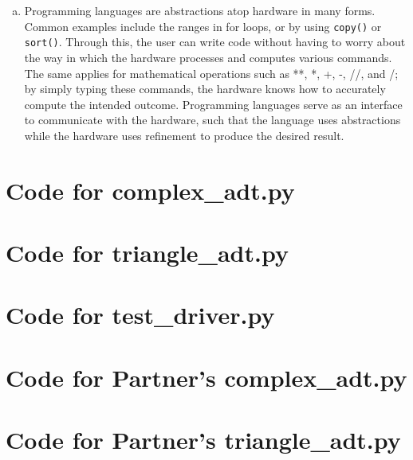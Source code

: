 \documentclass[12pt]{article}
\begin{document}
\begin{enumerate}[(a)]
\item Programming languages are abstractions atop hardware in many forms. Common examples include the ranges in for loops, or by using \verb|copy()| or \verb|sort()|. Through this, the user can write code without having to worry about the way in which the hardware processes and computes various commands. The same applies for mathematical operations such as **, *, +, -, //, and /; by simply typing these commands, the hardware knows how to accurately compute the intended outcome. Programming languages serve as an interface to communicate with the hardware, such that the language uses abstractions while the hardware uses refinement to produce the desired result. 


\end{enumerate}

\newpage

\lstset{language=Python, basicstyle=\tiny, breaklines=true, showspaces=false,
  showstringspaces=false, breakatwhitespace=true}

\def\thesection{\Alph{section}}

\section{Code for complex\_adt.py}

\noindent 

\newpage

\section{Code for triangle\_adt.py}

\noindent 

\newpage

\section{Code for test\_driver.py}

\noindent 

\newpage

\section{Code for Partner's complex\_adt.py}

\noindent 

\section{Code for Partner's triangle\_adt.py}

\noindent 
\end{document}
